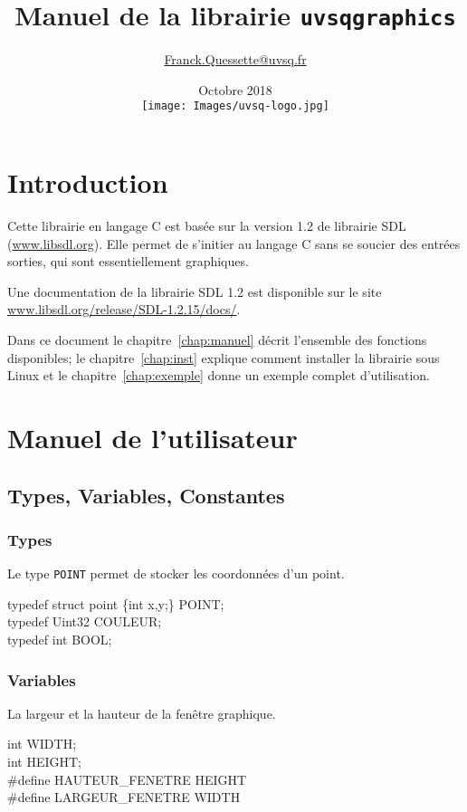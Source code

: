 \documentclass{report}
\title{Manuel de la librairie \texttt{uvsqgraphics}}
\author{\href{mailto:Franck.Quessette@uvsq.fr?Subject=uvsqgraphics}{Franck.Quessette@uvsq.fr}}
\date{Octobre 2018\\\texttt{[image: Images/uvsq-logo.jpg]}}
\newcommand\code[1]{
\begin{mdframed}[linecolor=purple,backgroundcolor=blue!10]
{\tt
#1
}
\end{mdframed}
}
\begin{document}
\maketitle
\tableofcontents

\chapter{Introduction}
Cette librairie en langage C est basée sur la version 1.2 de librairie SDL (\href{https://www.libsdl.org}{www.libsdl.org}).
Elle permet de s'initier au langage C sans se soucier des entrées sorties, qui sont essentiellement graphiques.

\vspace*{5mm}
Une documentation de la librairie SDL 1.2 est disponible sur le site \href{https://www.libsdl.org/release/SDL-1.2.15/docs/}{www.libsdl.org/release/SDL-1.2.15/docs/}.

\vspace*{5mm}
Dans ce document le chapitre~\ref{chap:manuel} décrit l'ensemble des fonctions disponibles;
le chapitre~\ref{chap:inst} explique comment installer la librairie sous Linux et 
le chapitre~\ref{chap:exemple} donne un exemple complet d'utilisation.

\chapter{Manuel de l'utilisateur\label{chap:manuel}}
\section{Types, Variables, Constantes}

\subsection{Types}
Le type \texttt{POINT} permet de stocker les coordonnées d'un point.
\code{
typedef struct point \{int x,y;\} POINT; \\
typedef Uint32 COULEUR; \\
typedef int BOOL;
}

\subsection{Variables}
La largeur et la hauteur de la fenêtre graphique.
\code{
int WIDTH; \\
int HEIGHT; \\
\#define HAUTEUR\_FENETRE HEIGHT\\
\#define LARGEUR\_FENETRE WIDTH
}
\end{document}
